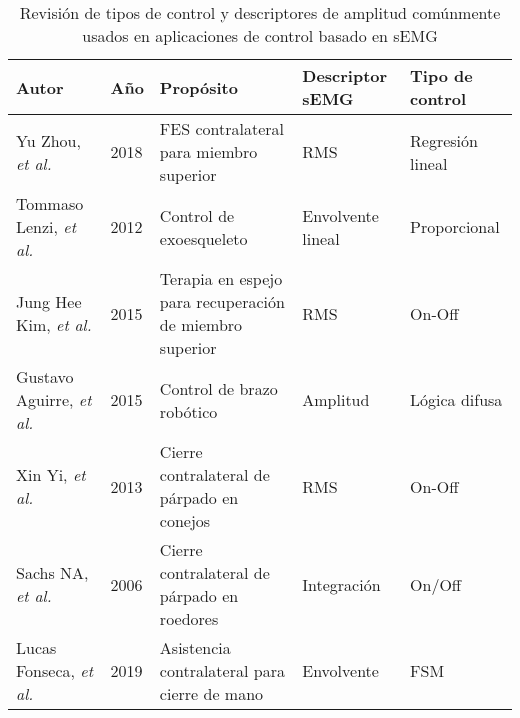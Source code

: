 \begin{table}[htb]
	\centering
	\begin{tabular}{|p{30mm}|p{10mm}|p{45mm}|p{25mm}|p{35mm}|}
	\hline
	\textbf{Autor} & \textbf{Año} & \textbf{Propósito} & \textbf{Descriptor sEMG} & \textbf{Tipo de control}\\
	\hline
	\hline
	Yu Zhou, \emph{et al.} \cite{Zhou2018} & 2018 & FES contralateral para miembro superior & RMS & Regresión lineal\\
	\hline
	Tommaso Lenzi, \emph{et al.} \cite{Lenzi2012} & 2012 & Control de exoesqueleto & Envolvente lineal & Proporcional\\
	\hline
	Jung Hee Kim, \emph{et al.} \cite{Kim2015} & 2015 & Terapia en espejo para recuperación de miembro superior & RMS & On-Off\\
	\hline
	Gustavo Aguirre, \emph{et al.} \cite{Aguirre-Vargas2015} & 2015 & Control de brazo robótico & Amplitud & Lógica difusa\\
	\hline
	Xin Yi, \emph{et al.} \cite{Yi2013} & 2013 & Cierre contralateral de párpado en conejos & RMS & On-Off\\
	\hline
	Sachs NA, \emph{et al.} \cite{Sachs2006} & 2006 & Cierre contralateral de párpado en roedores & Integración & On/Off\\
	\hline
	Lucas Fonseca, \emph{et al.} \cite{Fonseca2019} & 2019 & Asistencia contralateral para cierre de mano & Envolvente & FSM\\
	\hline
	\end{tabular}
	\caption{Revisión de tipos de control y descriptores de amplitud comúnmente usados en aplicaciones de control basado en sEMG}
	\label{Cuadro:Control}
\end{table}